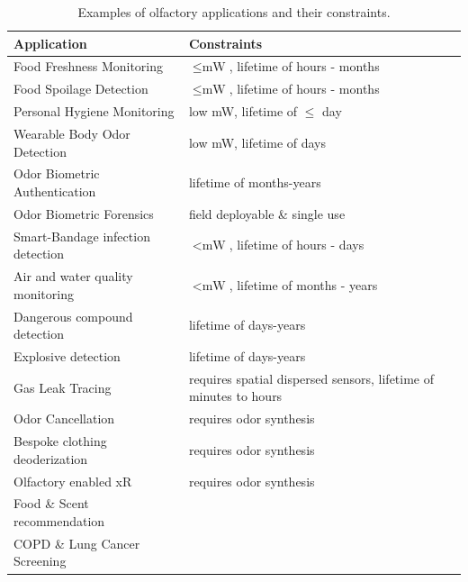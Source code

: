 \begin{table}[]
\caption{Examples of olfactory applications and their constraints.}
\label{tab:applications}
\begin{adjustbox}{max width=\linewidth}
\begin{tabular}{@{}ll@{}}
\toprule
\textbf{Application}              & \textbf{Constraints}     \\ \midrule
Food Freshness Monitoring         & \(\leq\si{\milli\watt}\), lifetime of hours - months \\
Food Spoilage Detection           & \(\leq\si{\milli\watt}\), lifetime of hours - months \\
Personal Hygiene Monitoring       & low \si{\milli\watt}, lifetime of $\leq$ day         \\
Wearable Body Odor Detection      & low \si{\milli\watt}, lifetime of days               \\
Odor Biometric Authentication     & lifetime of months-years                             \\
Odor Biometric Forensics          & field deployable \& single use                       \\
Smart-Bandage infection detection & \(<\si{\milli\watt}\), lifetime of hours - days      \\
Air and water quality monitoring  & \(<\si{\milli\watt}\), lifetime of months - years    \\
Dangerous compound detection      & lifetime of days-years                               \\
Explosive detection               & lifetime of days-years                               \\
Gas Leak Tracing                  & requires spatial dispersed sensors, lifetime of minutes to hours \\
Odor Cancellation                 & requires odor synthesis  \\
Bespoke clothing deoderization    & requires odor synthesis  \\
Olfactory enabled xR              & requires odor synthesis \\
Food \& Scent recommendation      &                          \\
COPD \& Lung Cancer Screening     &                          \\
    \bottomrule
\end{tabular}
\end{adjustbox}
\end{table}


